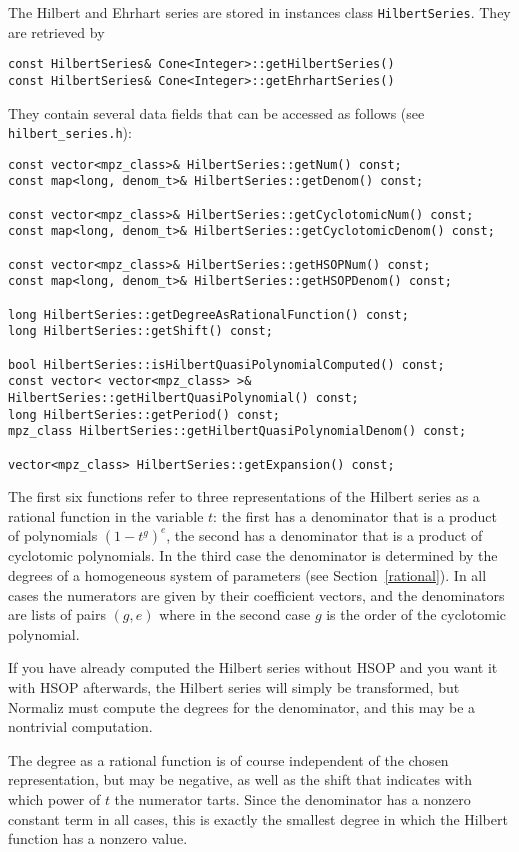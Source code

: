 \begin{small}
The Hilbert and Ehrhart series are stored in instances class \verb|HilbertSeries|. They are retrieved by
\begin{Verbatim}
const HilbertSeries& Cone<Integer>::getHilbertSeries()
const HilbertSeries& Cone<Integer>::getEhrhartSeries()
\end{Verbatim}
They contain several data fields that can be accessed as follows (see \verb|hilbert_series.h|):
\begin{Verbatim}
const vector<mpz_class>& HilbertSeries::getNum() const;
const map<long, denom_t>& HilbertSeries::getDenom() const;

const vector<mpz_class>& HilbertSeries::getCyclotomicNum() const;
const map<long, denom_t>& HilbertSeries::getCyclotomicDenom() const;

const vector<mpz_class>& HilbertSeries::getHSOPNum() const;
const map<long, denom_t>& HilbertSeries::getHSOPDenom() const;

long HilbertSeries::getDegreeAsRationalFunction() const;
long HilbertSeries::getShift() const;

bool HilbertSeries::isHilbertQuasiPolynomialComputed() const;
const vector< vector<mpz_class> >& HilbertSeries::getHilbertQuasiPolynomial() const;
long HilbertSeries::getPeriod() const;
mpz_class HilbertSeries::getHilbertQuasiPolynomialDenom() const;

vector<mpz_class> HilbertSeries::getExpansion() const;
\end{Verbatim}

The first six functions refer to three representations of the Hilbert series as a rational function in the variable $t$: the first has a denominator that is a product of polynomials $(1-t^g)^e$, the second has a denominator that is a product of cyclotomic polynomials. In the third case the denominator is determined by the degrees of a homogeneous system of parameters (see Section~\ref{rational}). In all cases the numerators are given by their coefficient vectors, and the denominators are lists of pairs $(g,e)$ where in the second case $g$ is the order of the cyclotomic polynomial.

If you have already computed the Hilbert series without HSOP and you want it with HSOP afterwards, the Hilbert series will simply be transformed, but Normaliz must compute the degrees for the denominator, and this may be a nontrivial computation.

The degree as a rational function is of course independent of the chosen representation, but may be negative, as well as the shift that indicates with which power of $t$ the numerator tarts. Since the denominator has a nonzero constant term in all cases, this is exactly the smallest degree in which the Hilbert function has a nonzero value.


\end{small}
